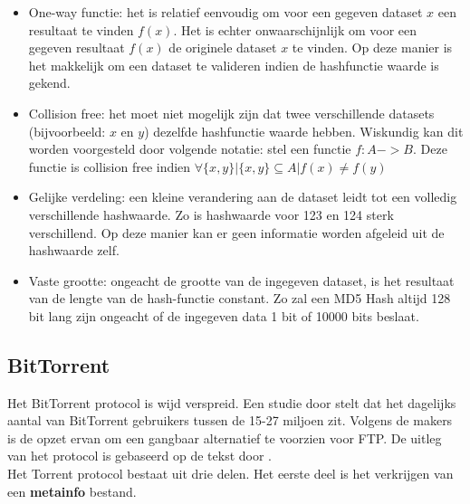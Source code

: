 \begin{itemize}
\item One-way functie: het is relatief eenvoudig om voor een gegeven dataset $x$ een resultaat te vinden $f(x)$. Het is echter onwaarschijnlijk om voor een gegeven resultaat $f(x)$ de originele dataset $x$ te vinden. Op deze manier is het makkelijk om een dataset te valideren indien de hashfunctie waarde is gekend.\\
\item Collision free: het moet niet mogelijk zijn dat twee verschillende datasets (bijvoorbeeld: $x$ en $y$) dezelfde hashfunctie waarde hebben. Wiskundig kan dit worden voorgesteld door volgende notatie: stel een functie $f:A->B$. Deze functie is collision free indien $\forall \{x,y\}|\{x,y\} \subseteq A | f(x) \neq f(y)$\\
\item Gelijke verdeling: een kleine verandering aan de dataset leidt tot een volledig verschillende hashwaarde. Zo is hashwaarde voor 123 en 124 sterk verschillend. Op deze manier kan er geen informatie worden afgeleid uit de hashwaarde zelf.\\
\item Vaste grootte: ongeacht de grootte van de ingegeven dataset, is het resultaat van de lengte van de hash-functie constant. Zo zal een MD5 Hash altijd 128 bit lang zijn ongeacht of de ingegeven data 1 bit of 10000 bits beslaat.
\end{itemize}


\subsection{BitTorrent}
 \label{torrenting}
Het BitTorrent protocol is wijd verspreid. Een studie door \textcite{Wang2013} stelt dat het dagelijks aantal van BitTorrent gebruikers tussen de 15-27 miljoen zit. Volgens de makers is de opzet ervan om een gangbaar alternatief te voorzien voor FTP. De uitleg van het protocol is gebaseerd op de tekst door \textcite{Fonseca2005}.\\ 

Het Torrent protocol bestaat uit drie delen. Het eerste deel is het verkrijgen van een \textbf{metainfo} bestand.\\

